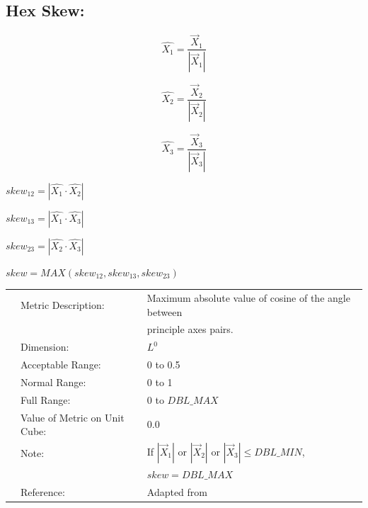 \documentclass[12pt]{article}
\begin{document}
\subsection*{Hex Skew:}

\begin{displaymath}
\hat{X_1} = \frac {\vec X_1} {\left| \vec X_1 \right| }
\end{displaymath}

\begin{displaymath}
\hat{X_2} = \frac {\vec X_2} {\left| \vec X_2 \right| }
\end{displaymath}

\begin{displaymath}
\hat{X_3} = \frac {\vec X_3} {\left| \vec X_3 \right| }
\end{displaymath}

\begin{center}
$skew_{12} = \left| \hat{X_1} \cdot \hat{X_2} \right|$
\end{center}

\begin{center}
$skew_{13} = \left| \hat{X_1} \cdot \hat{X_3} \right|$
\end{center}

\begin{center}
$skew_{23} = \left| \hat{X_2} \cdot \hat{X_3} \right|$
\end{center}

\begin{center}
$skew = MAX\left( skew_{12}, skew_{13}, skew_{23} \right)$
\end{center}

\begin{tabular}{lll}
& Metric Description:  & Maximum absolute value of cosine of the angle between  \\
&                      & principle axes pairs. \\
& Dimension:           & $L^0$                              \\ 
& Acceptable Range:    & 0 to 0.5   \\ 
& Normal Range:        & 0 to 1     \\ 
& Full Range:          & 0 to $DBL\_MAX$ \\ 
& Value of Metric on Unit Cube:    & 0.0 \\
& Note:                & If $|\vec X_1 |$ or $|\vec X_2 |$ or $|\vec X_3| \leq DBL\_MIN$, \\
&                      & $skew = DBL\_MAX$ \\
& Reference:           & Adapted from \cite{one} \\
\end{tabular} 
\end{document}
